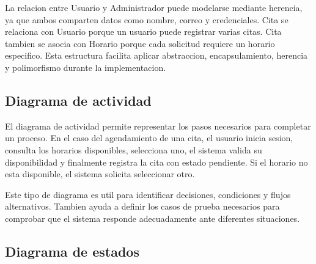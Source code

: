 \documentclass[12pt,letterpaper]{article}
\begin{document}

La relacion entre Usuario y Administrador puede modelarse mediante herencia, ya que ambos comparten datos como nombre, correo y credenciales. Cita se relaciona con Usuario porque un usuario puede registrar varias citas. Cita tambien se asocia con Horario porque cada solicitud requiere un horario especifico. Esta estructura facilita aplicar abstraccion, encapsulamiento, herencia y polimorfismo durante la implementacion.

\subsection{Diagrama de actividad}

El diagrama de actividad permite representar los pasos necesarios para completar un proceso. En el caso del agendamiento de una cita, el usuario inicia sesion, consulta los horarios disponibles, selecciona uno, el sistema valida su disponibilidad y finalmente registra la cita con estado pendiente. Si el horario no esta disponible, el sistema solicita seleccionar otro.


Este tipo de diagrama es util para identificar decisiones, condiciones y flujos alternativos. Tambien ayuda a definir los casos de prueba necesarios para comprobar que el sistema responde adecuadamente ante diferentes situaciones.

\subsection{Diagrama de estados}
\end{document}
